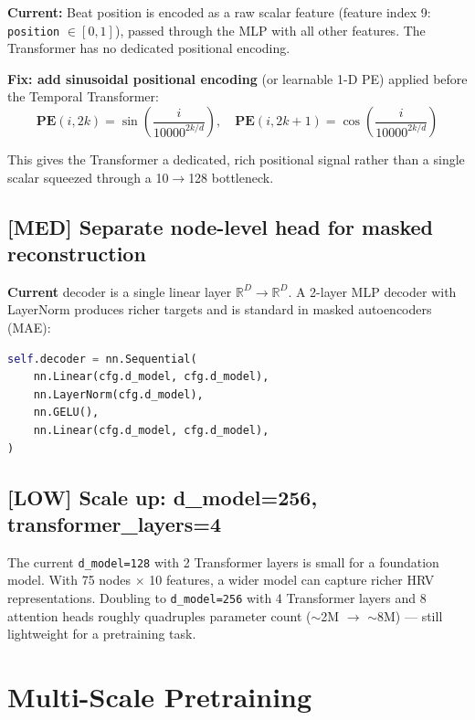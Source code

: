 \documentclass[11pt,a4paper]{article}
\newcommand{\med}[1]{\textcolor{impactmed}{\textbf{[MED]} #1}}
\newcommand{\low}[1]{\textcolor{impactlow}{\textbf{[LOW]} #1}}
\begin{document}
\textbf{Current:} Beat position is encoded as a raw scalar feature (feature index 9:
\texttt{position} $\in [0,1]$), passed through the MLP with all other features.
The Transformer has no dedicated positional encoding.

\textbf{Fix: add sinusoidal positional encoding} (or learnable 1-D PE) applied
before the Temporal Transformer:
\[
    \mathbf{PE}(i, 2k)   = \sin\!\left(\frac{i}{10000^{2k/d}}\right), \quad
    \mathbf{PE}(i, 2k+1) = \cos\!\left(\frac{i}{10000^{2k/d}}\right)
\]

This gives the Transformer a dedicated, rich positional signal rather than
a single scalar squeezed through a 10$\to$128 bottleneck.

\subsection{\med{Separate node-level head for masked reconstruction}}

\textbf{Current} decoder is a single linear layer $\mathbb{R}^D \to \mathbb{R}^D$.
A 2-layer MLP decoder with LayerNorm produces richer targets and is standard
in masked autoencoders (MAE):
\begin{lstlisting}[language=Python]
self.decoder = nn.Sequential(
    nn.Linear(cfg.d_model, cfg.d_model),
    nn.LayerNorm(cfg.d_model),
    nn.GELU(),
    nn.Linear(cfg.d_model, cfg.d_model),
)
\end{lstlisting}

\subsection{\low{Scale up: d\_model=256, transformer\_layers=4}}

The current \texttt{d\_model=128} with 2 Transformer layers is small for a foundation model.
With 75 nodes $\times$ 10 features, a wider model can capture richer HRV representations.
Doubling to \texttt{d\_model=256} with 4 Transformer layers and 8 attention heads
roughly quadruples parameter count ($\sim$2M $\to$ $\sim$8M) --- still lightweight
for a pretraining task.

\section{Multi-Scale Pretraining}
\end{document}
